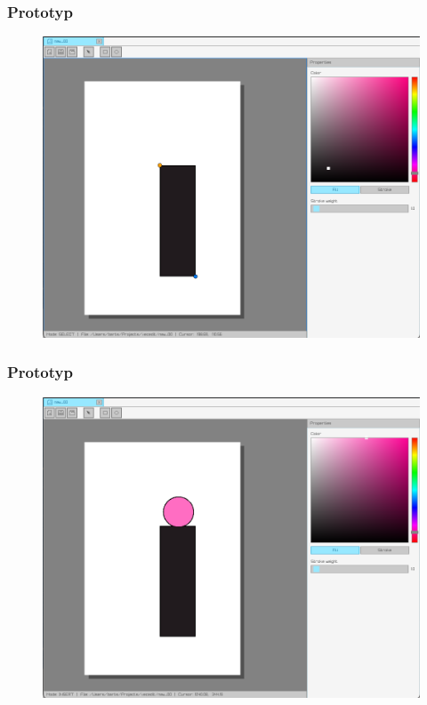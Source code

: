 \documentclass[
	11pt,]{beamer}
\begin{document}
\begin{frame}
	\frametitle{Prototyp}
	
	\begin{figure}
		\includegraphics[height=0.7\textheight]{figures/pro4.png}
	\end{figure}
\end{frame}

\begin{frame}
	\frametitle{Prototyp}
	
	\begin{figure}
		\includegraphics[height=0.7\textheight]{figures/pro5.png}
	\end{figure}
\end{frame}
\end{document}
